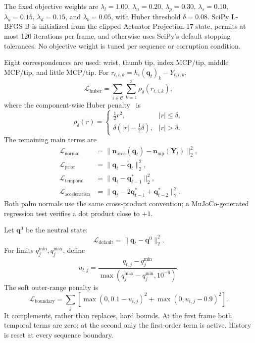 \documentclass[11pt]{article}
\begin{document}
The fixed objective weights are $\lambda_l=1.00$, $\lambda_n=0.20$, $\lambda_p=0.30$, $\lambda_s=0.10$, $\lambda_a=0.15$, $\lambda_d=0.15$, and $\lambda_b=0.05$, with Huber threshold $\delta=0.08$. SciPy L-BFGS-B is initialized from the clipped Actuator Projection-17 state, permits at most 120 iterations per frame, and otherwise uses SciPy's default stopping tolerances. No objective weight is tuned per sequence or corruption condition.

\begin{table}[t]
\centering
\caption{Frozen temporal-refinement parameters.}
\label{tab:optimizerparams}
\small

\end{table}

Eight correspondences are used: wrist, thumb tip, index MCP/tip, middle MCP/tip, and little MCP/tip. For $r_{t,i,k}=h_i(\mathbf q_t)_k-Y_{t,i,k}$,
\begin{equation}
\mathcal L_{\mathrm{huber}}=\sum_{i\in\mathcal C}\sum_{k=1}^{3}\rho_\delta(r_{t,i,k}),
\end{equation}
where the component-wise Huber penalty~\cite{huber1964robust} is
\begin{equation}
\rho_\delta(r)=
\begin{cases}
\frac{1}{2}r^2,& |r|\leq\delta,\\
\delta\left(|r|-\frac{1}{2}\delta\right),& |r|>\delta.
\end{cases}
\end{equation}
The remaining main terms are
\begin{align}
\mathcal L_{\mathrm{normal}}&=\|\mathbf n_{\mathrm{orca}}(\mathbf q_t)-\mathbf n_{\mathrm{mp}}(\mathbf Y_t)\|_2^2,\\
\mathcal L_{\mathrm{prior}}&=\|\mathbf q_t-\tilde{\mathbf q}_t\|_2^2,\\
\mathcal L_{\mathrm{temporal}}&=\|\mathbf q_t-\mathbf q_{t-1}^*\|_2^2,\\
\mathcal L_{\mathrm{acceleration}}&=\|\mathbf q_t-2\mathbf q_{t-1}^*+\mathbf q_{t-2}^*\|_2^2.
\end{align}
Both palm normals use the same cross-product convention; a MuJoCo-generated regression test verifies a dot product close to $+1$.

Let $\mathbf q^0$ be the neutral state:
\begin{equation}
\mathcal L_{\mathrm{default}}=\|\mathbf q_t-\mathbf q^0\|_2^2.
\end{equation}
For limits $q_j^{\min},q_j^{\max}$, define
\begin{equation}
u_{t,j}=\frac{q_{t,j}-q_j^{\min}}{\max(q_j^{\max}-q_j^{\min},10^{-6})}.
\end{equation}
The soft outer-range penalty is
\begin{equation}
\mathcal L_{\mathrm{boundary}}=\sum_j\left[\max(0,0.1-u_{t,j})^2+\max(0,u_{t,j}-0.9)^2\right].
\end{equation}
It complements, rather than replaces, hard bounds. At the first frame both temporal terms are zero; at the second only the first-order term is active. History is reset at every sequence boundary.
\end{document}
